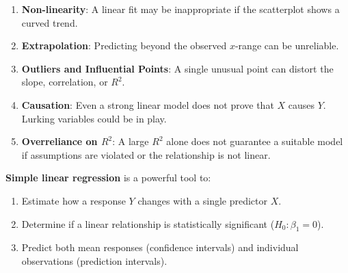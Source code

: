 \documentclass[10pt]{extarticle}
\begin{document}
\begin{enumerate}
    \item \textbf{Non-linearity}: A linear fit may be inappropriate if the scatterplot shows a curved trend.
    \item \textbf{Extrapolation}: Predicting beyond the observed $x$-range can be unreliable.
    \item \textbf{Outliers and Influential Points}: A single unusual point can distort the slope, correlation, or $R^2$.
    \item \textbf{Causation}: Even a strong linear model does not prove that $X$ causes $Y$. Lurking variables could be in play.
    \item \textbf{Overreliance on $R^2$}: A large $R^2$ alone does not guarantee a suitable model if assumptions are violated or the relationship is not linear.
\end{enumerate}
\begin{takeaway-box}{}{}
\textbf{Simple linear regression} is a powerful tool to:
\begin{enumerate}
    \item Estimate how a response $Y$ changes with a single predictor $X$.
    \item Determine if a linear relationship is statistically significant ($H_0:\beta_1=0$).
    \item Predict both mean responses (confidence intervals) and individual observations (prediction intervals).
\end{enumerate}
\end{takeaway-box}
\end{document}
